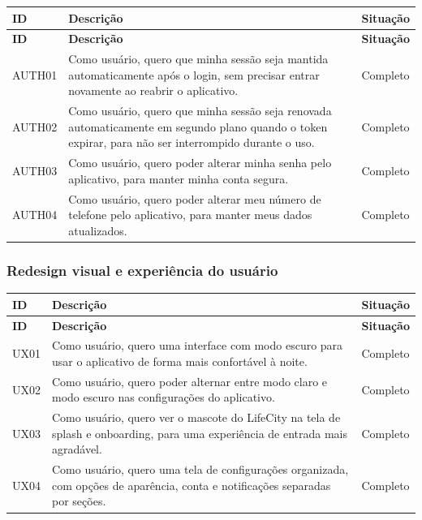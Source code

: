 \begin{longtable}{|p{2cm}|p{9cm}|p{2.5cm}|}
  \hline
  \textbf{ID} & \textbf{Descrição} & \textbf{Situação} \\
  \hline
  \endfirsthead
  \hline
  \textbf{ID} & \textbf{Descrição} & \textbf{Situação} \\
  \hline
  \endhead
  AUTH01 & Como usuário, quero que minha sessão seja mantida automaticamente após o login, sem precisar entrar novamente ao reabrir o aplicativo. & Completo \\
  \hline
  AUTH02 & Como usuário, quero que minha sessão seja renovada automaticamente em segundo plano quando o token expirar, para não ser interrompido durante o uso. & Completo \\
  \hline
  AUTH03 & Como usuário, quero poder alterar minha senha pelo aplicativo, para manter minha conta segura. & Completo \\
  \hline
  AUTH04 & Como usuário, quero poder alterar meu número de telefone pelo aplicativo, para manter meus dados atualizados. & Completo \\
  \hline
\end{longtable}

\subsubsection{Redesign visual e experiência do usuário}

\begin{longtable}{|p{2cm}|p{9cm}|p{2.5cm}|}
  \hline
  \textbf{ID} & \textbf{Descrição} & \textbf{Situação} \\
  \hline
  \endfirsthead
  \hline
  \textbf{ID} & \textbf{Descrição} & \textbf{Situação} \\
  \hline
  \endhead
  UX01 & Como usuário, quero uma interface com modo escuro para usar o aplicativo de forma mais confortável à noite. & Completo \\
  \hline
  UX02 & Como usuário, quero poder alternar entre modo claro e modo escuro nas configurações do aplicativo. & Completo \\
  \hline
  UX03 & Como usuário, quero ver o mascote do LifeCity na tela de splash e onboarding, para uma experiência de entrada mais agradável. & Completo \\
  \hline
  UX04 & Como usuário, quero uma tela de configurações organizada, com opções de aparência, conta e notificações separadas por seções. & Completo \\
  \hline
\end{longtable}

